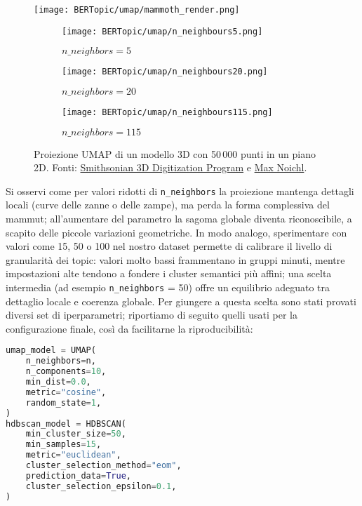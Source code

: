 \begin{figure}[H]
\centering
\texttt{[image: BERTopic/umap/mammoth\_render.png]}

\begin{subfigure}{0.32\textwidth}
    \centering
    \texttt{[image: BERTopic/umap/n\_neighbours5.png]}
    \caption{$n\_neighbors = 5$}
\end{subfigure}\hfill
\begin{subfigure}{0.32\textwidth}
    \centering
    \texttt{[image: BERTopic/umap/n\_neighbours20.png]}
    \caption{$n\_neighbors = 20$}
\end{subfigure}\hfill
\begin{subfigure}{0.32\textwidth}
    \centering
    \texttt{[image: BERTopic/umap/n\_neighbours115.png]}
    \caption{$n\_neighbors = 115$}
\end{subfigure}
\caption{Proiezione UMAP di un modello 3D con 50\,000 punti in un piano 2D. Fonti: \href{https://3d.si.edu/object/3d/mammuthus-primigenius-blumbach:341c96cd-f967-4540-8ed1-d3fc56d31f12}{Smithsonian 3D Digitization Program} e \href{https://www.maxnoichl.eu/projects/mammoth/}{Max Noichl}.}
\label{fig:umap-mammoth}
\end{figure}
Si osservi come per valori ridotti di \texttt{n\_neighbors} la proiezione mantenga dettagli locali (curve delle zanne o delle zampe), ma perda la forma complessiva del mammut; all'aumentare del parametro la sagoma globale diventa riconoscibile, a scapito delle piccole variazioni geometriche. In modo analogo, sperimentare con valori come 15, 50 o 100 nel nostro dataset permette di calibrare il livello di granularità dei topic: valori molto bassi frammentano in gruppi minuti, mentre impostazioni alte tendono a fondere i cluster semantici più affini; una scelta intermedia (ad esempio \texttt{n\_neighbors} = 50) offre un equilibrio adeguato tra dettaglio locale e coerenza globale.
Per giungere a questa scelta sono stati provati diversi set di iperparametri; riportiamo di seguito quelli usati per la configurazione finale, così da facilitarne la riproducibilità:

\begin{lstlisting}[language=Python]
umap_model = UMAP(
    n_neighbors=n,
    n_components=10,
    min_dist=0.0,
    metric="cosine",
    random_state=1,
)
hdbscan_model = HDBSCAN(
    min_cluster_size=50,
    min_samples=15,
    metric="euclidean",
    cluster_selection_method="eom",
    prediction_data=True,
    cluster_selection_epsilon=0.1,
)
\end{lstlisting}

